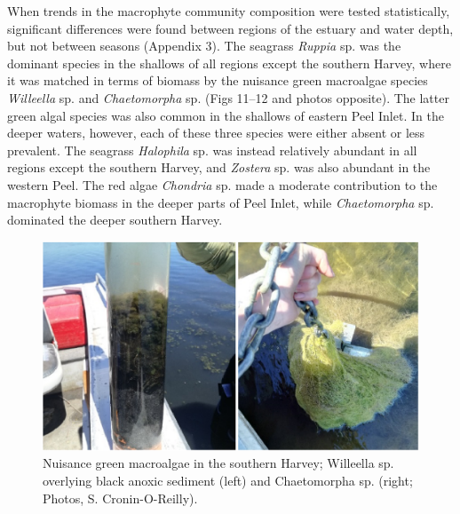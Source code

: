 \documentclass[
]{book}
\begin{document}
When trends in the macrophyte community composition were tested statistically, significant differences were found between regions of the estuary and water depth, but not between seasons (Appendix 3). The seagrass \emph{Ruppia} sp. was the dominant species in the shallows of all regions except the southern Harvey, where it was matched in terms of biomass by the nuisance green macroalgae species \emph{Willeella} sp. and \emph{Chaetomorpha} sp. (Figs 11--12 and photos opposite). The latter green algal species was also common in the shallows of eastern Peel Inlet. In the deeper waters, however, each of these three species were either absent or less prevalent. The seagrass \emph{Halophila} sp. was instead relatively abundant in all regions except the southern Harvey, and \emph{Zostera} sp. was also abundant in the western Peel. The red algae \emph{Chondria} sp. made a moderate contribution to the macrophyte biomass in the deeper parts of Peel Inlet, while \emph{Chaetomorpha} sp. dominated the deeper southern Harvey.

\begin{figure}
\includegraphics[width=0.5\linewidth]{images/macrophytes/picture13} \caption{Nuisance green macroalgae in the southern Harvey; Willeella sp. overlying black anoxic sediment (left) and Chaetomorpha sp. (right; Photos, S. Cronin-O-Reilly).}\label{fig:macrophytes-pic13}
\end{figure}
\end{document}
